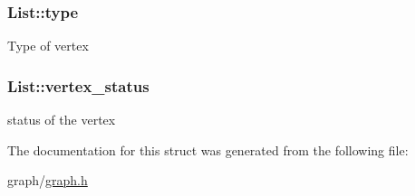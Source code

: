 \subsubsection[{\texorpdfstring{type}{type}}]{ List\+::type}\hypertarget{structList_a9500b07a968a38aebec491f92df9f7b3}{}\label{structList_a9500b07a968a38aebec491f92df9f7b3}
Type of vertex 
\subsubsection[{\texorpdfstring{vertex\+\_\+status}{vertex_status}}]{ List\+::vertex\+\_\+status}\hypertarget{structList_adb605295623ba6ef67a3d2b7550ad8b2}{}\label{structList_adb605295623ba6ef67a3d2b7550ad8b2}
status of the vertex 

The documentation for this struct was generated from the following file\+:\begin{DoxyCompactItemize}
\item 
graph/\hyperlink{graph_8h}{graph.\+h}\end{DoxyCompactItemize}
